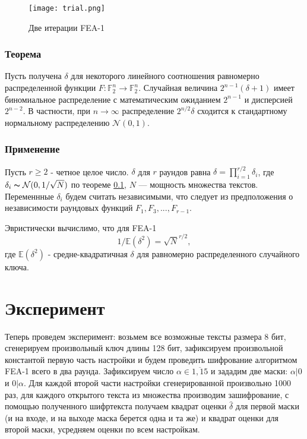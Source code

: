 \documentclass[utf8x, 14pt]{G7-32} %
\begin{document}
\begin{figure}[h!]
	\centering
	\texttt{[image: trial.png]}
	\caption{Две итерации FEA-1}
	\label{fig:trial}
\end{figure}

\subsection{Теорема}\label{theorem}

 Пусть получена $\delta$ для некоторого линейного соотношения равномерно распределенной функции $F: \mathbb{F}_2^n \to \mathbb{F}_2^n$. Случайная величина $2^{n-1}(\delta+1)$ имеет биномиальное распределение с математическим ожиданием $2^{n-1}$ и дисперсией $2^{n-2}$. В частности, при $n\to\infty$ распределение $2^{n/2}\delta$ сходится к стандартному нормальному распределению $\mathcal{N}(0,1)$.

\subsection{Применение}

Пусть $r\geq 2$ - четное целое число. $\delta$ для $r$ раундов равна $\delta=\prod_{i=1}^{r/2} \delta_i$, где $\delta_i \thicksim \mathcal{N}(0,1/\sqrt{N})$ по теореме \ref{theorem}, $N$ --- мощность множества текстов. Переменнные $\delta_i$ будем считать независимыми, что следует из предположения о независимости раундовых функций $F_1, F_3, ..., F_{r-1}$.

Эвристически вычислимо, что для FEA-1
\begin{equation}
\label{eqn:keyeq}
1/\mathbb{E}(\delta^2)=\sqrt{N}^{r/2},\end{equation} 
где $\mathbb{E}(\delta^2)$ - средне-квадратичная $\delta$ для равномерно распределенного случайного ключа.


\chapter{Эксперимент}
Теперь проведем эксперимент: возьмем все возможные тексты размера 8 бит, сгенерируем произвольный ключ длины 128 бит, зафиксируем произвольной константой первую часть настройки и будем проведить шифрование алгоритмом FEA-1 всего в два раунда. Зафиксируем число $\alpha \in \overline{1,15}$ и зададим две маски: $\alpha|0$ и $0|\alpha$. Для каждой второй части настройки сгенерированной произвольно 1000 раз, для каждого открытого текста из множества производим зашифрование, с помощью полученного шифртекста получаем квадрат оценки $\hat{\delta}$ для первой маски (и на входе, и на выходе маска берется одна и та же) и квадрат оценки для второй маски, усредняем оценки по всем настройкам. 
\end{document}
